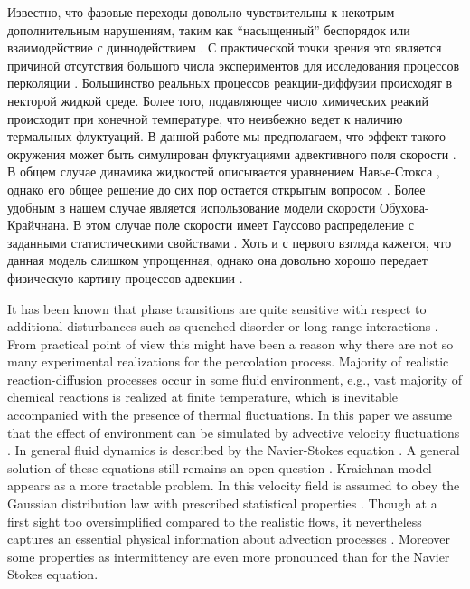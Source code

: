 \documentclass[12pt]{article}
\begin{document}
Известно, что фазовые переходы довольно чувствительны к некотрым дополнительным нарушениям, таким как ``насыщенный'' беспорядок \cite{Janssen96} или взаимодействие с диннодействием \cite{Hinrichsen}.
С практической точки зрения это является причиной отсутствия большого числа экспериментов для исследования процессов перколяции \cite{RRR03,TKCS07}.
Большинство реальных процессов реакции-диффузии происходят в некторой жидкой среде.
Более того, подавляющее число химических реакий происходит при конечной температуре, что неизбежно ведет к наличию термальных флуктуаций.
В данной работе мы предполагаем, что эффект такого окружения может быть симулирован флуктуациями адвективного поля скорости \cite{FGV01}.
В общем случае динамика жидкостей описывается уравнением Навье-Стокса \cite{Landau_fluid}, однако его общее решение до сих пор остается открытым вопросом \cite{Landau_fluid}.
Более удобным в нашем случае является использование модели скорости Обухова-Крайчнана.
В этом случае поле скорости имеет Гауссово распределение с заданными статистическими свойствами \cite{FGV01,Ant99}.
Хоть и с первого взгляда кажется, что данная модель слишком упрощенная, однако она довольно хорошо передает физическую картину процессов адвекции \cite{FGV01}.

It has been known that phase transitions are quite sensitive with respect
to additional disturbances such as quenched disorder \cite{Janssen96} or long-range
interactions \cite{Hinrichsen}. From practical point of view
this might have been a reason why there are not so many experimental
realizations \cite{RRR03,TKCS07} for the percolation process.
Majority of realistic reaction-diffusion processes occur in some fluid environment, e.g., vast majority
 of chemical reactions is realized at finite temperature, which is inevitable accompanied with the 
 presence of thermal fluctuations.
In this paper we assume that the effect of environment can be simulated by advective velocity 
fluctuations \cite{FGV01}. 
In general fluid dynamics is described by the Navier-Stokes equation \cite{Landau_fluid}.
A general solution of these equations still remains an open question
 \cite{Frisch,Monin}. Kraichnan model appears
 as a more tractable problem. In this velocity field is
 assumed to obey the Gaussian distribution law with prescribed  statistical properties \cite{FGV01,Ant99}.
 Though at a first sight too
 oversimplified compared to the realistic flows, it nevertheless captures an essential
 physical information about advection processes \cite{FGV01}. Moreover some
 properties as intermittency are even more pronounced than for the Navier Stokes equation.
 
\end{document}
